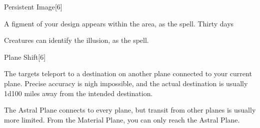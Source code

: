 \begin{spellsection}{Persistent Image}[6]
    \begin{spellheader}
    \end{spellheader}
    \begin{spellcontent}
        \begin{spelltargetinginfo}
        \end{spelltargetinginfo}
        \begin{spelleffects}
            \spelleffect A figment of your design appears within the area, as the  spell.
            \spelldur Thirty days \dismissable
        \end{spelleffects}
    \end{spellcontent}
    \begin{spellfooter}
        \spellnotes Creatures can identify the illusion, as the  spell.
    \end{spellfooter}
    \begin{spellaugments}
    \end{spellaugments}
\end{spellsection}

\begin{spellsection}{Plane Shift}[6]
    \begin{spellheader}
    \end{spellheader}
    \begin{spellcontent}
        \begin{spelltargetinginfo}
        \end{spelltargetinginfo}
        \begin{spelleffects}
            \spelleffect The targets teleport to a destination on another plane connected to your current plane. Precise accuracy is nigh impossible, and the actual destination is usually 1d100 miles away from the intended destination.
        \end{spelleffects}
    \end{spellcontent}
    \begin{spellfooter}
        \spellnotes The Astral Plane connects to every plane, but transit from other planes is usually more limited. From the Material Plane, you can only reach the Astral Plane.
    \end{spellfooter}
\end{spellsection}

